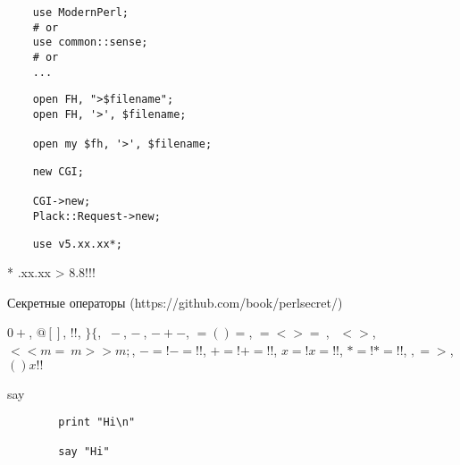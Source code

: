\documentclass[14pt]{beamer}
\begin{document}
\begin{frame}[fragile]
    \lstset{language=Perl}
    \begin{lstlisting}
    use ModernPerl;
    # or
    use common::sense;
    # or
    ...
    \end{lstlisting}
\end{frame}

\begin{frame}[fragile]
    \lstset{language=Perl}
    \begin{lstlisting}
    open FH, ">$filename";
    open FH, '>', $filename;

    open my $fh, '>', $filename;
    \end{lstlisting}
\end{frame}

\begin{frame}[fragile]
    \lstset{language=Perl}
    \begin{lstlisting}
    new CGI;

    CGI->new;
    Plack::Request->new;
    \end{lstlisting}
\end{frame}

\begin{frame}[fragile]
    \lstset{language=Perl}
    \begin{lstlisting}
    use v5.xx.xx*;
    \end{lstlisting}

    * .xx.xx > 8.8!!!
\end{frame}

\begin{frame}
    \begin{center}
    Секретные операторы (https://github.com/book/perlsecret/)
    \newline

    $0+$,
    $@{[ ]}$,
    $!!$,
    $\}\{$,
    $~-$,
    $-~$,
    $-+-$,
    $=( )=$,
    $=< >=~$,
    $~~<>$,
    $<<m=~m>> m;$,
    $-=!   -=!!$,
    $+=!   +=!!$,
    $x=!   x=!!$,
    $*=!   *=!!$,
    $,=>$,
    $()x!!$
    \end{center}
\end{frame}

\begin{frame}[fragile]
    say
    \lstset{language=Perl}
    \begin{lstlisting}
        print "Hi\n"

        say "Hi"
    \end{lstlisting}
\end{frame}
\end{document}
